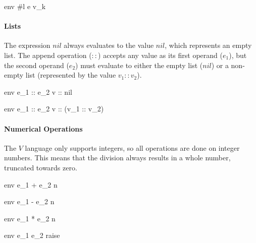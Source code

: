\documentclass{article}
\begin{document}
    {\mbox{env} \vdash \#l \; e \Downarrow v_k}


\paragraph{Lists}
The expression $nil$ always evaluates to the value $nil$, which represents an empty list.
The append operation ($::$) accepts any value as its first operand ($e_1$), but the second operand ($e_2$) must evaluate to either the empty list ($nil$) or a non-empty list (represented by the value $v_1 :: v_2$).


    {\mbox{env} \vdash e_1 :: e_2 \Downarrow v :: nil}

    {\mbox{env} \vdash e_1 :: e_2 \Downarrow v :: (v_1 :: v_2)}


\paragraph{Numerical Operations}
The $V$ language only supports integers, so all operations are done on integer numbers.
This means that the division always results in a whole number, truncated towards zero.

\medskip

    {\mbox{env} \vdash e_1 + e_2 \Downarrow n}

    {\mbox{env} \vdash e_1 - e_2 \Downarrow n}

    {\mbox{env} \vdash e_1 * e_2 \Downarrow n}

    {\mbox{env} \vdash e_1 \div e_2 \Downarrow raise}
\end{document}
